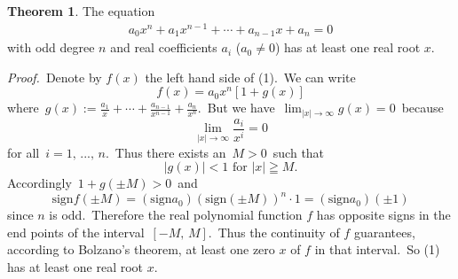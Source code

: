\documentclass[12pt]{article}
\theoremstyle{definition}
\newtheorem*{thmplain}{Theorem}
\begin{document}
\begin{thmplain}
The equation
\begin{align}
                a_0x^n+a_1x^{n-1}+\cdots+a_{n-1}x+a_n = 0
\end{align}
with odd degree $n$ and real coefficients $a_i$ ($a_0 \ne 0$) has at least one real root $x$.
\end{thmplain}

{\em Proof.}\, Denote by $f(x)$ the left hand side of (1).\, We can write
                      $$f(x) = a_0x^n[1+g(x)]$$
where\, $\displaystyle g(x) := \frac{a_1}{x}\!+\cdots\!+\!\frac{a_{n-1}}{x^{n-1}}\!+\!\frac{a_n}{x^n}$.\, But we have\, 
$\displaystyle\lim_{|x|\to\infty}g(x) = 0$\, because
$$\lim_{|x|\to\infty}\frac{a_i}{x^i} = 0$$
for all\, $i = 1,\,...,\,n$.\, Thus there exists an\, $M > 0$\, such that 
$$|g(x)| < 1\,\, \mbox{for}\,\, |x| \geqq M.$$
Accordingly\, $1+g(\pm M) > 0$\, and
$$\mbox{sign} f(\pm M) = (\mbox{sign} a_0)(\mbox{sign}(\pm M))^n\cdot 1 = 
  (\mbox{sign} a_0)(\pm 1)$$
since $n$ is odd.\, Therefore the real polynomial function $f$ has opposite signs in the end points of the interval\, $[-M,\,M]$.\, Thus the continuity of $f$ guarantees, according to Bolzano's theorem, at least one zero $x$ of $f$ in that interval.\, So (1) has at least one real root $x$.
\end{document}
